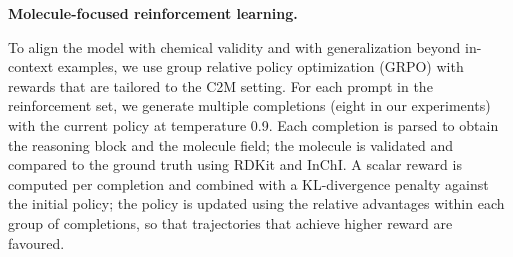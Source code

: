\documentclass[11pt]{article}
\begin{document}
\noindent\textbf{Molecule-focused reinforcement learning.}

To align the model with chemical validity and with generalization beyond in-context examples, we use group relative policy optimization (GRPO)\cite{shao2024grpo} with rewards that are tailored to the C2M setting. For each prompt in the reinforcement set, we generate multiple completions (eight in our experiments) with the current policy at temperature 0.9. Each completion is parsed to obtain the reasoning block and the molecule field; the molecule is validated and compared to the ground truth using RDKit\cite{rdkit} and InChI\cite{heller2015inchi}. A scalar reward is computed per completion and combined with a KL-divergence penalty against the initial policy; the policy is updated using the relative advantages within each group of completions, so that trajectories that achieve higher reward are favoured.
\end{document}

